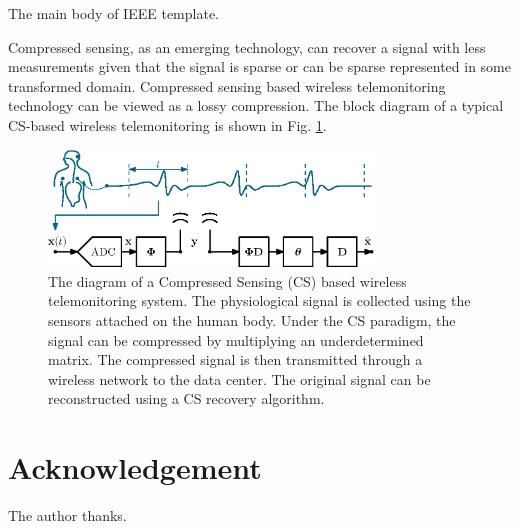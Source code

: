 \documentclass[conference]{IEEEtran}
\begin{document}
The main body of IEEE\cite{Zhang2012a} template.

Compressed sensing\cite{Candes2008a}, as an emerging technology, can recover a signal with less measurements given that the signal is sparse or can be sparse represented in some transformed domain. Compressed sensing based wireless telemonitoring technology\cite{dixon2012compressed,mamaghanian2011compressed,Abdulghani2010,Zhang_TBME2012a,Zhang_TBME2012b} can be viewed as a lossy compression. The block diagram of a typical CS-based wireless telemonitoring is shown in Fig. \ref{fig:diagram}.
\begin{figure}[ht!]
\centering
\includegraphics[width=3.4in]{diagram}
\caption{The diagram of a Compressed Sensing (CS) based wireless telemonitoring system. The physiological signal is collected using the sensors attached on the human body. Under the CS paradigm, the signal can be compressed by multiplying an underdetermined matrix. The compressed signal is then transmitted through a wireless network to the data center. The original signal can be reconstructed using a CS recovery algorithm.}%
\label{fig:diagram}
\end{figure}


\section*{Acknowledgement}
The author thanks.

\ifCLASSOPTIONcaptionsoff
  \newpage
\fi




%

\end{document}
